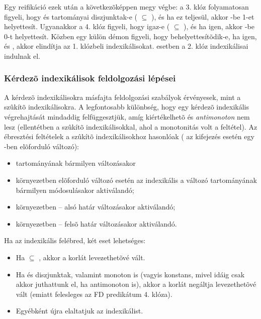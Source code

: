 Egy  reifikáció ezek után a következõképpen megy végbe: a
3. klóz folyamatosan figyeli, hogy  és  tartományai diszjunktak-e
( $\subseteq$ ), és ha ez teljesül, akkor -be
1-et helyettesít. Ugyanakkor a 4. klóz figyeli, hogy  igaz-e (
$\subseteq$ ), és ha igen, akkor -be 0-t helyettesít. Közben
egy külön démon figyeli, hogy  behelyettesítõdik-e, ha igen, és ,
akkor elindítja az 1. klózbeli indexikálisokat.  esetben a 2. klóz
indexikálisai indulnak el.

\subsubsection{Kérdezõ indexikálisok feldolgozási lépései}

A kérdezõ indexikálisokra másfajta feldolgozási szabályok érvényesek, mint a
szûkítõ indexikálisokra. A legfontosabb különbség, hogy egy kérdezõ indexikális
végrehajtását mindaddig felfüggesztjük, amíg kiértékelhetõ és \emph{antimonoton}
nem lesz (ellentétben a szûkítõ indexikálisokkal, ahol a monotonitás volt a
feltétel). Az ébresztési feltételek a szûkítõ indexikálisokhoz hasonlóak
( az  kifejezés esetén egy -ben elõforduló változó):

\begin{itemize}
	\item {} tartományának bármilyen változásakor
        \item {} környezetben elõforduló  változó esetén az
        indexikális a változó tartományának bármilyen módosulásakor
        aktiválandó; 
        \item {} környezetben -- alsó határ változásakor
        aktiválandó;
         \item
         környezetben -- felsõ határ változásakor aktiválandó.
\end{itemize}

Ha az indexikális felébred, két eset lehetséges:

\begin{itemize}
        \item Ha  $\subseteq$ , akkor a korlát levezethetõvé vált.
        \item Ha   és  diszjunktak, valamint
         monoton is (vagyis konstans, mivel idáig csak akkor juthattunk el,
	ha antimonoton is), akkor a korlát negáltja levezethetõvé vált (emiatt
        felesleges az  FD predikátum 4. klóza).
	\item Egyébként újra elaltatjuk az indexikálist. 
\end{itemize}

